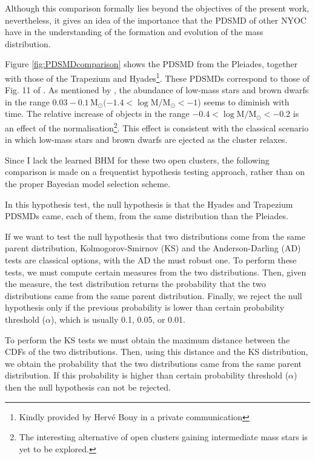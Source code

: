 Although this comparison formally lies beyond the objectives of the present work, nevertheless, it gives an idea of the importance that the PDSMD of other NYOC have in the understanding of the formation and evolution of the mass distribution.

Figure \ref{fig:PDSMDcomparison} shows the PDSMD from the Pleiades, together with those of the Trapezium and Hyades\footnote{Kindly provided by Herv\'e Bouy in a private communication}. These PDSMDs correspond to those of  Fig. 11 of \citet{Bouy2015}. As mentioned by \citet{Bouy2015}, the abundance of low-mass stars and brown dwarfs in the range $0.03 - 0.1\,\mathrm{M_{\odot}}(-1.4 < \log \mathrm{M/M_{\odot}} <-1$) seems to diminish with time. The relative increase of objects in the range $-0.4 < \mathrm{\log M/M_{\odot}} < -0.2$ is an effect of the normalisation\footnote{The interesting alternative of open clusters gaining intermediate mass stars is yet to be explored.}. This effect is consistent with the classical scenario in which low-mass stars and brown dwarfs are ejected as the cluster relaxes.

Since I lack the learned BHM for these two open clusters, the following comparison is made on a frequentist hypothesis testing approach, rather than on the proper Bayesian model selection scheme.

In this hypothesis test, the null hypothesis is that the Hyades and Trapezium PDSMDs came, each of them, from the same distribution than the Pleiades. 

If we want to test the null hypothesis that two distributions come from the same parent distribution, Kolmogorov-Smirnov (KS) and the Anderson-Darling (AD) tests are classical options, with the AD the must robust one. To perform these tests, we must compute certain measures from the two distributions. Then, given the measure, the test distribution returns the probability that the two distributions came from the same parent distribution. Finally, we reject the null hypothesis only if the previous probability is lower than certain probability threshold ($\alpha$), which is usually 0.1, 0.05, or 0.01. 

To perform the KS tests we must obtain the maximum distance between the CDFs of the two distributions. Then, using this distance and the KS distribution, we obtain the probability that the two distributions came from the same parent distribution. If this probability is higher than certain probability threshold ($\alpha$) then the null hypothesis can not be rejected. 

